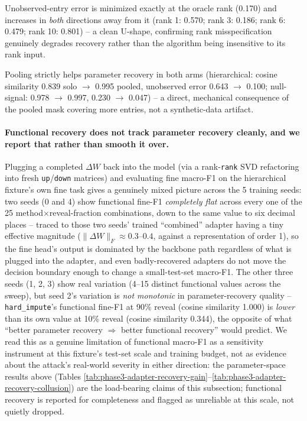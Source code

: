 \documentclass[11pt]{article}
\begin{document}

\label{tab:phase3-adapter-recovery-rank}
Unobserved-entry error is minimized exactly at the oracle rank (0.170) and
increases in \emph{both} directions away from it (rank 1: 0.570; rank 3:
0.186; rank 6: 0.479; rank 10: 0.801) -- a clean U-shape, confirming rank
misspecification genuinely degrades recovery rather than the algorithm
being insensitive to its rank input.


\label{tab:phase3-adapter-recovery-collusion}
Pooling strictly helps parameter recovery in both arms (hierarchical:
cosine similarity 0.839 solo $\to$ 0.995 pooled, unobserved error 0.643
$\to$ 0.100; null-signal: 0.978 $\to$ 0.997, 0.230 $\to$ 0.047) -- a
direct, mechanical consequence of the pooled mask covering more entries,
not a synthetic-data artifact.

\paragraph{Functional recovery does not track parameter recovery cleanly,
and we report that rather than smooth it over.} Plugging a completed
$\Delta W$ back into the model (via a rank-\texttt{rank} SVD refactoring
into fresh \texttt{up}/\texttt{down} matrices) and evaluating fine
macro-F1 on the hierarchical fixture's own fine task gives a genuinely
mixed picture across the 5 training seeds: two seeds (0 and 4) show
functional fine-F1 \emph{completely flat} across every one of the 25
method$\times$reveal-fraction combinations, down to the same value to six
decimal places -- traced to those two seeds' trained ``combined'' adapter
having a tiny effective magnitude ($\|\Delta W\|_F \approx 0.3$--$0.4$,
against a representation of order 1), so the fine head's output is
dominated by the backbone path regardless of what is plugged into the
adapter, and even badly-recovered adapters do not move the decision
boundary enough to change a small-test-set macro-F1. The other three
seeds (1, 2, 3) show real variation (4--15 distinct functional values
across the sweep), but seed 2's variation is \emph{not monotonic} in
parameter-recovery quality -- \texttt{hard\_impute}'s functional fine-F1
at 90\% reveal (cosine similarity 1.000) is \emph{lower} than its own
value at 10\% reveal (cosine similarity 0.344), the opposite of what
``better parameter recovery $\Rightarrow$ better functional recovery''
would predict. We read this as a genuine limitation of functional
macro-F1 as a sensitivity instrument at this fixture's test-set scale and
training budget, not as evidence about the attack's real-world severity in
either direction: the parameter-space results above (Tables
\ref{tab:phase3-adapter-recovery-gain}--\ref{tab:phase3-adapter-recovery-collusion})
are the load-bearing claims of this subsection; functional recovery is
reported for completeness and flagged as unreliable at this scale, not
quietly dropped.
\end{document}
